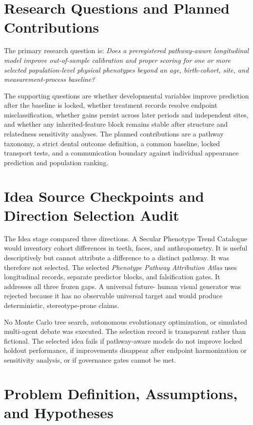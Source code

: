 \documentclass[conference]{IEEEtran}
\begin{document}
\section{Research Questions and Planned Contributions}

The primary research question is: \emph{Does a preregistered pathway-aware
longitudinal model improve out-of-sample calibration and proper scoring for
one or more selected population-level physical phenotypes beyond an age,
birth-cohort, site, and measurement-process baseline?}

The supporting questions are whether developmental variables improve
prediction after the baseline is locked, whether treatment records resolve
endpoint misclassification, whether gains persist across later periods and
independent sites, and whether any inherited-feature block remains stable
after structure and relatedness sensitivity analyses. The planned
contributions are a pathway taxonomy, a strict dental outcome definition, a
common baseline, locked transport tests, and a communication boundary against
individual appearance prediction and population ranking.

\section{Idea Source Checkpoints and Direction Selection Audit}

The Idea stage compared three directions. A Secular Phenotype Trend Catalogue
would inventory cohort differences in teeth, faces, and anthropometry. It is
useful descriptively but cannot attribute a difference to a distinct pathway.
It was therefore not selected. The selected \emph{Phenotype Pathway
Attribution Atlas} uses longitudinal records, separate predictor blocks, and
falsification gates. It addresses all three frozen gaps. A universal future-
human visual generator was rejected because it has no observable universal
target and would produce deterministic, stereotype-prone claims.

No Monte Carlo tree search, autonomous evolutionary optimization, or
simulated multi-agent debate was executed. The selection record is
transparent rather than fictional. The selected idea fails if pathway-aware
models do not improve locked holdout performance, if improvements disappear
after endpoint harmonization or sensitivity analysis, or if governance gates
cannot be met.

\section{Problem Definition, Assumptions, and Hypotheses}
\end{document}
